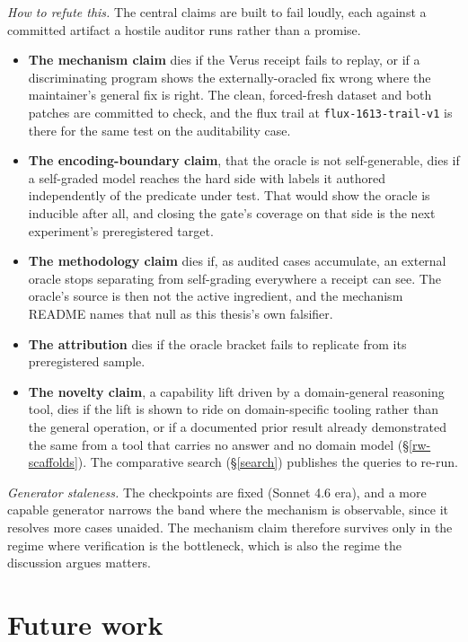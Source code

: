 \documentclass[
  10pt,
]{article}
\providecommand{\tightlist}{%
  \setlength{\itemsep}{0pt}\setlength{\parskip}{0pt}}
\begin{document}
\emph{How to refute this.} The central claims are built to fail loudly,
each against a committed artifact a hostile auditor runs rather than a
promise.

\begin{itemize}
\tightlist
\item
  \textbf{The mechanism claim} dies if the Verus receipt fails to
  replay, or if a discriminating program shows the externally-oracled
  fix wrong where the maintainer's general fix is right. The clean,
  forced-fresh dataset and both patches are committed to check, and the
  flux trail at \texttt{flux-1613-trail-v1} is there for the same test
  on the auditability case.
\item
  \textbf{The encoding-boundary claim}, that the oracle is not
  self-generable, dies if a self-graded model reaches the hard side with
  labels it authored independently of the predicate under test. That
  would show the oracle is inducible after all, and closing the gate's
  coverage on that side is the next experiment's preregistered target.
\item
  \textbf{The methodology claim} dies if, as audited cases accumulate,
  an external oracle stops separating from self-grading everywhere a
  receipt can see. The oracle's source is then not the active
  ingredient, and the mechanism README names that null as this thesis's
  own falsifier.
\item
  \textbf{The attribution} dies if the oracle bracket fails to replicate
  from its preregistered sample.
\item
  \textbf{The novelty claim}, a capability lift driven by a
  domain-general reasoning tool, dies if the lift is shown to ride on
  domain-specific tooling rather than the general operation, or if a
  documented prior result already demonstrated the same from a tool that
  carries no answer and no domain model (\S\ref{rw-scaffolds}). The
  comparative search (\S\ref{search}) publishes the queries to re-run.
\end{itemize}

\emph{Generator staleness.} The checkpoints are fixed (Sonnet 4.6 era),
and a more capable generator narrows the band where the mechanism is
observable, since it resolves more cases unaided. The mechanism claim
therefore survives only in the regime where verification is the
bottleneck, which is also the regime the discussion argues matters.

\section{Future work}\label{future-work}
\end{document}
